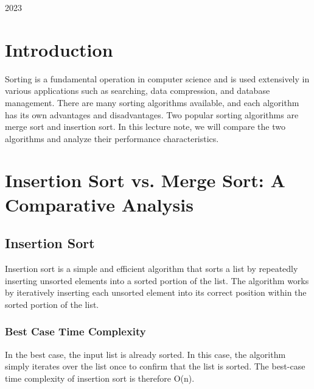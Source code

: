 \documentclass[a4paper, 11pt, oneside]{book} %
\begin{document}
\begin{titlepage}
	\vspace{0.5\baselineskip} %

	
	\vfill %
	
	
	
	
	\vspace{0.3\baselineskip} %
	
	2023 %

\end{titlepage}

\section{Introduction}

Sorting is a fundamental operation in computer science and is used extensively in various applications such as searching, data compression, and database management. There are many sorting algorithms available, and each algorithm has its own advantages and disadvantages. Two popular sorting algorithms are merge sort and insertion sort. In this lecture note, we will compare the two algorithms and analyze their performance characteristics.

\section{Insertion Sort vs. Merge Sort: A Comparative Analysis}

\subsection{Insertion Sort}
Insertion sort is a simple and efficient algorithm that sorts a list by repeatedly inserting unsorted elements into a sorted portion of the list. The algorithm works by iteratively inserting each unsorted element into its correct position within the sorted portion of the list.

\subsubsection{Best Case Time Complexity}
In the best case, the input list is already sorted. In this case, the algorithm simply iterates over the list once to confirm that the list is sorted. The best-case time complexity of insertion sort is therefore O(n).
\end{document}

